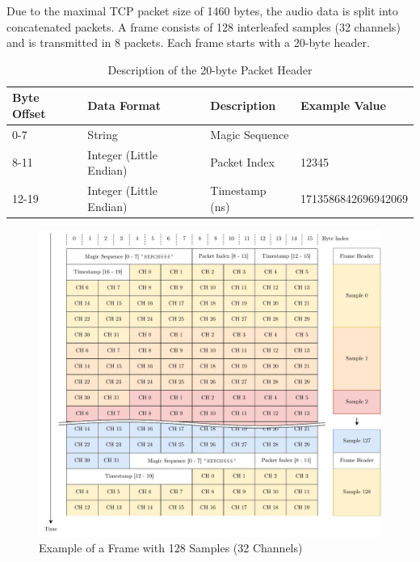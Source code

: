 Due to the maximal TCP packet size of 1460 bytes, the audio data is split into concatenated packets.
A frame consists of 128 interleafed samples (32 channels) and is transmitted in 8 packets.
Each frame starts with a 20-byte header.

\begin{table}[h!]
	\centering
	\begin{tabular}{|l|l|l|l|}
		\hline
		\textbf{Byte Offset} & \textbf{Data Format}    & \textbf{Description} & \textbf{Example Value} \\ \hline
		0-7                  & String                  & Magic Sequence       & \codeword{HERON666}    \\ \hline
		8-11                 & Integer (Little Endian) & Packet Index         & 12345                  \\ \hline
		12-19                & Integer (Little Endian) & Timestamp (ns)       & 1713586842696942069    \\ \hline
	\end{tabular}
	\caption{Description of the 20-byte Packet Header}
	\label{tab:packet_header}
\end{table}

\begin{figure}
	\centering
	\includegraphics[width=1.0\textwidth]{images/6_design_final/Audio_Stream_Frame.pdf}
	\caption{Example of a Frame with 128 Samples (32 Channels)}
	\label{fig:frame_example}
\end{figure}

